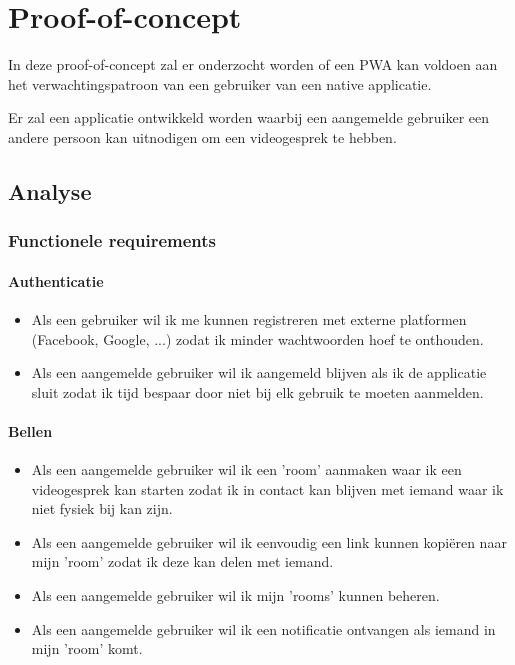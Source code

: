 \chapter{Proof-of-concept}
\label{ch:Proof-of-concept}


In deze proof-of-concept zal er onderzocht worden of een PWA kan voldoen aan het verwachtingspatroon van een gebruiker van een native applicatie.

Er zal een applicatie ontwikkeld worden waarbij een aangemelde gebruiker een andere persoon kan uitnodigen om een videogesprek te hebben. 

 \section{Analyse}
	 \subsection{Functionele requirements}
	 	\subsubsection{Authenticatie}
		 	\begin{itemize}
			 	\item Als een gebruiker wil ik me kunnen registreren met externe platformen (Facebook, Google, ...) zodat ik minder wachtwoorden hoef te onthouden.
			 	\item Als een aangemelde gebruiker wil ik aangemeld blijven als ik de applicatie sluit zodat ik tijd bespaar door  niet bij elk gebruik te moeten aanmelden.
		 	\end{itemize}
		 	
		 \subsubsection{Bellen}
			  \begin{itemize}
			   	\item Als een aangemelde gebruiker wil ik een 'room' aanmaken waar ik een videogesprek kan starten zodat ik in contact kan blijven met iemand waar ik niet fysiek bij kan zijn.
			   	\item Als een aangemelde gebruiker wil ik eenvoudig een link kunnen kopiëren naar mijn 'room' zodat ik deze kan delen met iemand.
			   	\item Als een aangemelde gebruiker wil ik mijn 'rooms' kunnen beheren.
			   	\item Als een aangemelde gebruiker wil ik een notificatie ontvangen als iemand in mijn 'room' komt.
			  \end{itemize}
	 	
